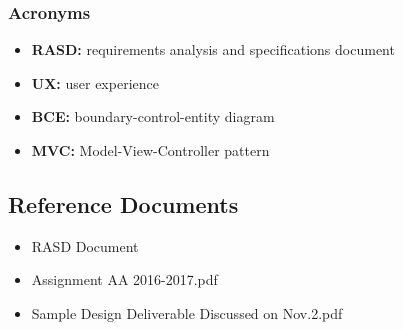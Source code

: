 \subsubsection{Acronyms}
\begin{itemize}
\item \textbf{RASD:} requirements analysis and specifications document
\item \textbf{UX:} user experience
\item \textbf{BCE:} boundary-control-entity diagram
\item \textbf{MVC:} Model-View-Controller pattern 
\end{itemize}	

\subsection{Reference Documents}
\begin{itemize}
\item RASD Document
\item Assignment AA 2016-2017.pdf
\item Sample Design Deliverable Discussed on Nov.2.pdf
\end{itemize}


